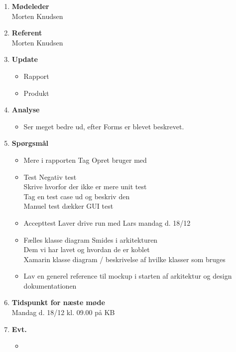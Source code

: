 	\begin{enumerate}
		\itemsep 0.3em 
		\item \textbf{Mødeleder}\\
			Morten Knudsen
		\item \textbf{Referent}\\
			Morten Knudsen

		\item \textbf{Update}
			\begin{itemize}[-]
				\item Rapport 
				\item Produkt			
			\end{itemize}
		
		\item \textbf{Analyse}
		\begin{itemize}[-]
			\item Ser meget bedre ud, efter Forms er blevet beskrevet.			
		\end{itemize}
					
		\item \textbf{Spørgsmål}
			\begin{itemize}[-]
				\item Mere i rapporten
				Tag Opret bruger med \\
				\item Test
				Negativ test \\
				Skrive hvorfor der ikke er mere unit test \\
				Tag en test case ud og beskriv den \\
				Manuel test dækker GUI test \\
				\item Accepttest
				Laver drive run med Lars mandag d. 18/12 \\	
				\item Fælles klasse diagram
				Smides i arkitekturen \\
				Dem vi har lavet og hvordan de er koblet \\
				Xamarin klasse diagram / beskrivelse af hvilke klasser som bruges\\
				\item Lav en generel reference til mockup i starten af arkitektur og design dokumentationen \\
					
			\end{itemize}
	
		\item \textbf{Tidspunkt for næste møde} \\
			Mandag d. 18/12 kl. 09.00 på KB \\
						
		\item \textbf{Evt.}
			\begin{itemize}[-]
				\item 
			\end{itemize}
			
	\end{enumerate}
